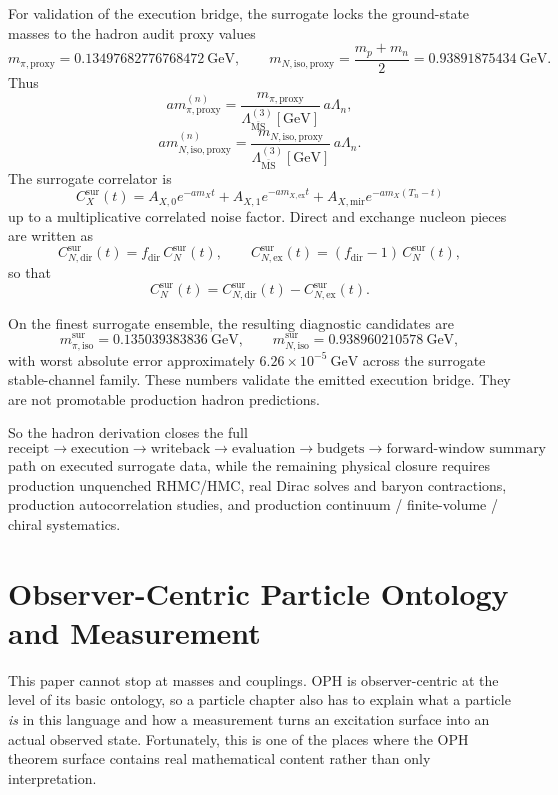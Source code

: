 \documentclass[11pt]{article}
\begin{document}
For validation of the execution bridge, the surrogate locks the ground-state masses to the hadron
audit proxy values
\[
m_{\pi,\mathrm{proxy}} = 0.13497682776768472\ \mathrm{GeV},
\qquad
m_{N,\mathrm{iso,proxy}}
=
\frac{m_p+m_n}{2}
=
0.93891875434\ \mathrm{GeV}.
\]
Thus
\[
a m_{\pi,\mathrm{proxy}}^{(n)}
=
\frac{m_{\pi,\mathrm{proxy}}}{\Lambda_{\overline{\mathrm{MS}}}^{(3)}[\mathrm{GeV}]}
\,a\Lambda_n,
\]
\[
a m_{N,\mathrm{iso,proxy}}^{(n)}
=
\frac{m_{N,\mathrm{iso,proxy}}}{\Lambda_{\overline{\mathrm{MS}}}^{(3)}[\mathrm{GeV}]}
\,a\Lambda_n.
\]
The surrogate correlator is
\[
C_X^{\mathrm{sur}}(t)
=
A_{X,0} e^{-a m_X t}
+
A_{X,1} e^{-a m_{X,\mathrm{ex}} t}
+
A_{X,\mathrm{mir}} e^{-a m_X (T_n-t)}
\]
up to a multiplicative correlated noise factor. Direct and exchange nucleon pieces are written as
\[
C_{N,\mathrm{dir}}^{\mathrm{sur}}(t)
=
f_{\mathrm{dir}}\,C_N^{\mathrm{sur}}(t),
\qquad
C_{N,\mathrm{ex}}^{\mathrm{sur}}(t)
=
(f_{\mathrm{dir}}-1)\,C_N^{\mathrm{sur}}(t),
\]
so that
\[
C_N^{\mathrm{sur}}(t)
=
C_{N,\mathrm{dir}}^{\mathrm{sur}}(t)
-
C_{N,\mathrm{ex}}^{\mathrm{sur}}(t).
\]

On the finest surrogate ensemble, the resulting diagnostic candidates are
\[
m_{\pi,\mathrm{iso}}^{\mathrm{sur}} = 0.135039383836\ \mathrm{GeV},
\qquad
m_{N,\mathrm{iso}}^{\mathrm{sur}} = 0.938960210578\ \mathrm{GeV},
\]
with worst absolute error approximately \(6.26\times10^{-5}\ \mathrm{GeV}\) across the surrogate
stable-channel family. These numbers validate the emitted execution bridge. They are not
promotable production hadron predictions.

So the hadron derivation closes the full
\[
\text{receipt} \to \text{execution} \to \text{writeback} \to \text{evaluation} \to \text{budgets} \to \text{forward-window summary}
\]
path on executed surrogate data, while the remaining physical closure requires production
unquenched RHMC/HMC, real Dirac solves and baryon contractions, production autocorrelation
studies, and production continuum / finite-volume / chiral systematics.

\section{Observer-Centric Particle Ontology and Measurement}

This paper cannot stop at masses and couplings. OPH is observer-centric at the level of
its basic ontology, so a particle chapter also has to explain what a particle \emph{is} in this
language and how a measurement turns an excitation surface into an actual observed state.
Fortunately, this is one of the places where the OPH theorem surface contains
real mathematical content rather than only interpretation.
\end{document}
